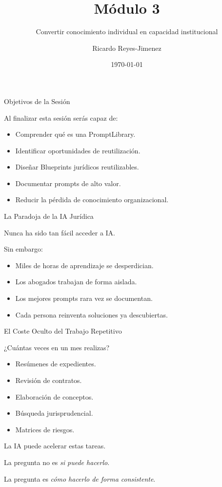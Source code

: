 \documentclass[aspectratio=169]{beamer}
\title[Módulo 3]{Módulo 3}
\subtitle{ Convertir conocimiento individual en capacidad institucional}
\author{Ricardo Reyes-Jimenez}
\institute{Universidad de La Sabana}
\date{\today}
\begin{document}
\begin{frame}
  \titlepage
\end{frame}

\usebackgroundtemplate{}


\begin{frame}{Objetivos de la Sesión}


Al finalizar esta sesión serás capaz de:

\begin{itemize}
  \item Comprender qué es una PromptLibrary.
  \item Identificar oportunidades de reutilización.
  \item Diseñar Blueprints jurídicos reutilizables.
  \item Documentar prompts de alto valor.
  \item Reducir la pérdida de conocimiento organizacional.
\end{itemize}
\end{frame}

\begin{frame}{La Paradoja de la IA Jurídica}


Nunca ha sido tan fácil acceder a IA.

Sin embargo:

\begin{itemize}
  \item Miles de horas de aprendizaje se desperdician.
  \item Los abogados trabajan de forma aislada.
  \item Los mejores prompts rara vez se documentan.
  \item Cada persona reinventa soluciones ya descubiertas.
\end{itemize}
\end{frame}

\begin{frame}{El Coste Oculto del Trabajo Repetitivo}


¿Cuántas veces en un mes realizas?

\begin{itemize}
  \item Resúmenes de expedientes.
  \item Revisión de contratos.
  \item Elaboración de conceptos.
  \item Búsqueda jurisprudencial.
  \item Matrices de riesgos.
\end{itemize}
La IA puede acelerar estas tareas.

La pregunta no es \textit{si puede hacerlo}.

La pregunta es \textit{cómo hacerlo de forma consistente}.

\end{frame}
\end{document}

